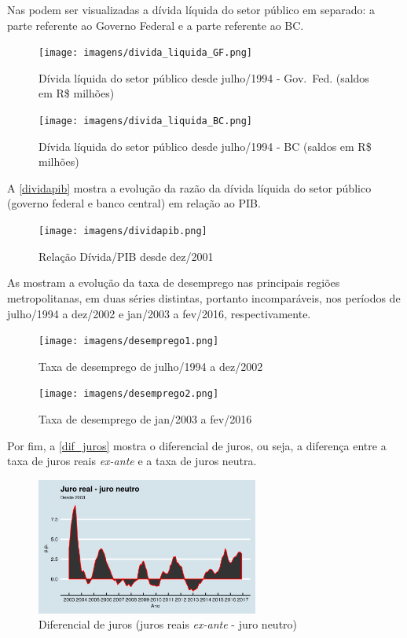 \documentclass[]{article}
\begin{document}
Nas  podem ser visualizadas
a dívida líquida do setor público em separado: a parte referente ao
Governo Federal e a parte referente ao BC.

\begin{figure}
\centering
\texttt{[image: imagens/divida\_liquida\_GF.png]}
\caption{Dívida líquida do setor público desde julho/1994 - Gov.~Fed.
(saldos em R\$ milhões)}\label{divida_liquida_GF}
\end{figure}

\begin{figure}
\centering
\texttt{[image: imagens/divida\_liquida\_BC.png]}
\caption{Dívida líquida do setor público desde julho/1994 - BC (saldos
em R\$ milhões)}\label{divida_liquida_BC}
\end{figure}

A \autoref{dividapib} mostra a evolução da razão da dívida líquida do
setor público (governo federal e banco central) em relação ao PIB.

\begin{figure}
\centering
\texttt{[image: imagens/dividapib.png]}
\caption{Relação Dívida/PIB desde dez/2001}\label{dividapib}
\end{figure}

As  mostram a evolução da taxa de
desemprego nas principais regiões metropolitanas, em duas séries
distintas, portanto incomparáveis, nos períodos de julho/1994 a dez/2002
e jan/2003 a fev/2016, respectivamente.

\begin{figure}
\centering
\texttt{[image: imagens/desemprego1.png]}
\caption{Taxa de desemprego de julho/1994 a dez/2002}\label{desemprego1}
\end{figure}

\begin{figure}
\centering
\texttt{[image: imagens/desemprego2.png]}
\caption{Taxa de desemprego de jan/2003 a fev/2016}\label{desemprego2}
\end{figure}

Por fim, a \autoref{dif_juros} mostra o diferencial de juros, ou seja, a
diferença entre a taxa de juros reais \emph{ex-ante} e a taxa de juros
neutra.

\begin{figure}
\centering
\includegraphics[width=0.65000\textwidth]{imagens/dif_juros.png}
\caption{Diferencial de juros (juros reais \emph{ex-ante} - juro
neutro)}\label{dif_juros}
\end{figure}
\end{document}
